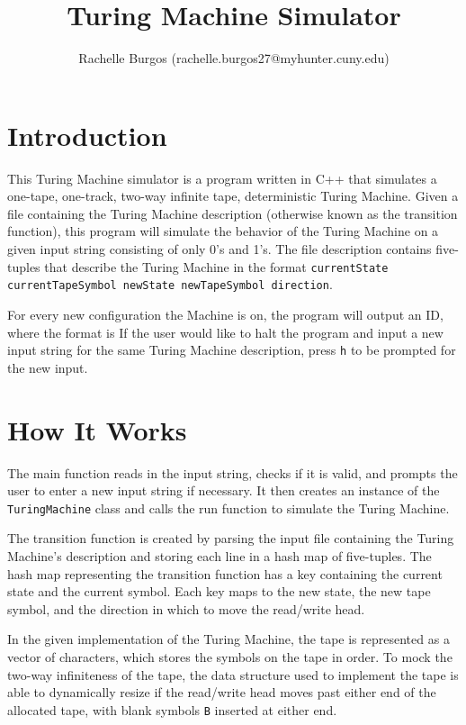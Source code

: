 \documentclass{article}
\title{Turing Machine Simulator}
\author{Rachelle Burgos (rachelle.burgos27@myhunter.cuny.edu)}
\begin{document}
\maketitle

\section{Introduction}

This Turing Machine simulator is a program written in C++ that simulates a one-tape, one-track, two-way infinite tape, deterministic Turing Machine.
Given a file containing the Turing Machine description (otherwise known as the transition function), this program will simulate the behavior of the Turing Machine on a given input string consisting of only 0's and 1's.
The file description contains five-tuples that describe the Turing Machine in the format
\texttt{currentState currentTapeSymbol newState newTapeSymbol direction}.

For every new configuration the Machine is on, the program will output an ID, where the format is
If the user would like to halt the program and input a new input string for the same Turing Machine description, press \texttt{h} to be prompted for the new input.

\section{How It Works}

The main function reads in the input string, checks if it is valid, and prompts the user to enter a new input string if necessary. 
It then creates an instance of the \texttt{TuringMachine} class and calls the run function to simulate the Turing Machine.

The transition function is created by parsing the input file containing the Turing Machine's description and storing each line in a hash map of five-tuples. 
The hash map representing the transition function has a key containing the current state and the current symbol. 
Each key maps to the new state, the new tape symbol, and the direction in which to move the read/write head.

In the given implementation of the Turing Machine, the tape is represented as a vector of characters, which stores the symbols on the tape in order. 
To mock the two-way infiniteness of the tape, the data structure used to implement the tape is able to dynamically resize if the read/write head moves past either end of the allocated tape, with blank symbols \texttt{B} inserted at either end.
\end{document}
